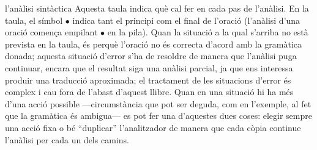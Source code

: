 \begin{persabermes}{l'anàlisi sintàctica}
  Aquesta taula indica què cal fer en cada pas de l'anàlisi. En la
  taula, el símbol $\bullet$ indica tant el principi com el final de
  l'oració (l'anàlisi d'una oració comença empilant $\bullet$ en la
  pila). Quan la situació a la qual s'arriba no està prevista en la
  taula, és perquè l'oració no és correcta d'acord amb la gramàtica
  donada; aquesta situació d'error s'ha de resoldre de manera que
  l'anàlisi puga continuar, encara que el resultat siga una anàlisi
  parcial, ja que ens interessa produir una traducció aproximada; el
  tractament de les situacions d'error és complex i cau fora de
  l'abast d'aquest llibre. Quan en una situació hi ha més d'una acció
  possible ---circumstància que pot ser deguda, com en l'exemple, al
  fet que la gramàtica és ambigua--- es pot fer una d'aquestes dues
  coses: elegir sempre una acció fixa o bé ``duplicar'' l'analitzador
  de manera que cada còpia continue l'anàlisi per cada un dels camins.


\end{persabermes}
